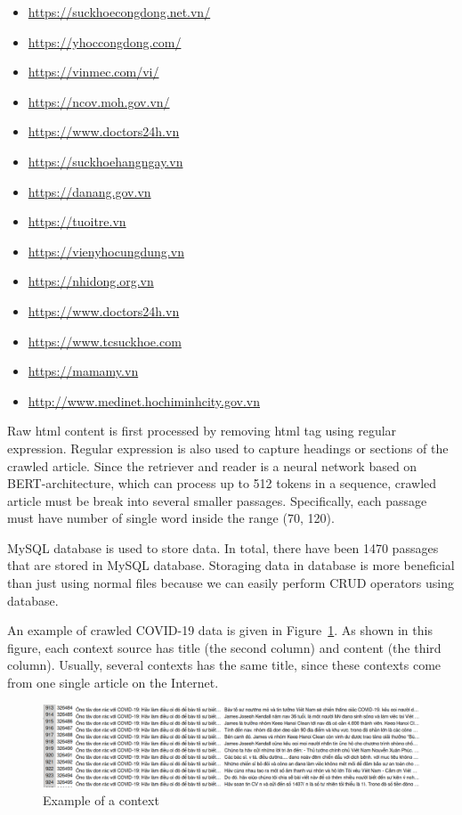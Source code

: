 \documentclass[3p, sort&compress, 12pt]{elsarticle}
\begin{document}
\begin{itemize}
	\item \url{https://suckhoecongdong.net.vn/}
	\item \url{https://yhoccongdong.com/}
	\item \url{https://vinmec.com/vi/}
	\item \url{https://ncov.moh.gov.vn/}
	\item \url{https://www.doctors24h.vn}
	\item \url{https://suckhoehangngay.vn}
	\item \url{https://danang.gov.vn}
	\item \url{https://tuoitre.vn}
	\item \url{https://vienyhocungdung.vn}
	\item \url{https://nhidong.org.vn}
	\item \url{https://www.doctors24h.vn}
	\item \url{https://www.tcsuckhoe.com}
	\item \url{https://mamamy.vn}
	\item \url{http://www.medinet.hochiminhcity.gov.vn}
\end{itemize}
Raw html content is first processed by removing html tag using regular expression. Regular expression is also used to capture headings or sections of the crawled article. Since the retriever and reader is a neural network based on BERT-architecture, which can process up to 512 tokens in a sequence, crawled article must be break into several smaller passages. Specifically, each passage must have number of single word inside the range (70, 120).
\par MySQL database is used to store data. In total, there have been 1470 passages that are stored in MySQL database. Storaging data in database is more beneficial than just using normal files because we can easily perform CRUD operators using database. 
\par An example of crawled COVID-19 data is given in Figure~\ref{fig:09}. As shown in this figure, each context source has title (the second column) and content (the third column). Usually, several contexts has the same title, since these contexts come from one single article on the Internet. 
\begin{figure}
	\centering
	\includegraphics[scale=.5]{images/crawled_data.png}
	\caption{Example of a context}
	\label{fig:09}
\end{figure}
\end{document}
